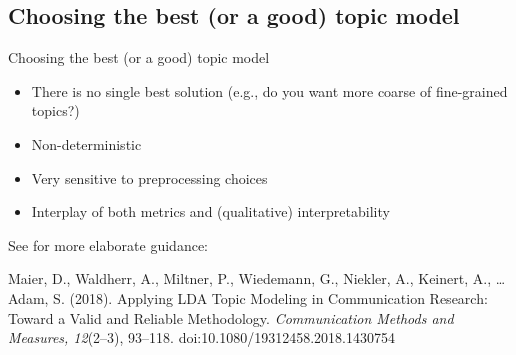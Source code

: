 \subsection{Choosing the best (or a good) topic model}

\begin{frame}{Choosing the best (or a good) topic model}
	\begin{itemize}
		\item There is no single best solution (e.g., do you want more coarse of fine-grained topics?)
		\item Non-deterministic
		\item Very sensitive to preprocessing choices
		\item Interplay of both metrics and (qualitative) interpretability 
	\end{itemize}
	
	See for more elaborate guidance:
	
	\tiny{Maier, D., Waldherr, A., Miltner, P., Wiedemann, G., Niekler, A., Keinert, A., \ldots Adam, S. (2018). Applying LDA Topic Modeling in Communication Research: Toward a Valid and Reliable Methodology. \textit{Communication Methods and Measures, 12}(2--3), 93--118. doi:10.1080/19312458.2018.1430754}
	
\end{frame}



